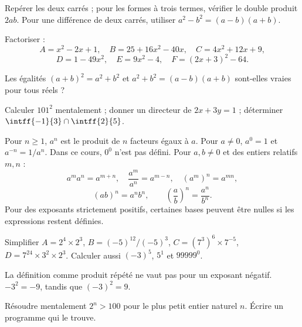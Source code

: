 \begin{method}
Repérer les deux carrés ; pour les formes à trois termes, vérifier le double produit $2ab$. Pour une différence de deux carrés, utiliser $a^2-b^2=(a-b)(a+b)$.
\end{method}
\begin{example}Factoriser :
\[A=x^2-2x+1,\quad B=25+16x^2-40x,\quad C=4x^2+12x+9,\]
\[D=1-49x^2,\quad E=9x^2-4,\quad F=(2x+3)^2-64.\]\end{example}
\begin{example}Les égalités $(a+b)^2=a^2+b^2$ et $a^2+b^2=(a-b)(a+b)$ sont-elles vraies pour tous réels ?\end{example}
\begin{fluency}[5--10 min]Calculer $101^2$ mentalement ; donner un directeur de $2x+3y=1$ ; déterminer $\intff{-1}{3}\cap\intff{2}{5}$.\end{fluency}

\begin{keypoint}
Pour $n\geq1$, $a^n$ est le produit de $n$ facteurs égaux à $a$. Pour $a\ne0$, $a^0=1$ et $a^{-n}=1/a^n$. Dans ce cours, $0^0$ n'est pas défini.
Pour $a,b\ne0$ et des entiers relatifs $m,n$ :
\[a^ma^n=a^{m+n},\quad\frac{a^m}{a^n}=a^{m-n},\quad(a^m)^n=a^{mn},\]
\[(ab)^n=a^nb^n,\qquad\left(\frac ab\right)^n=\frac{a^n}{b^n}.\]
Pour des exposants strictement positifs, certaines bases peuvent être nulles si les expressions restent définies.
\end{keypoint}
\begin{example}Simplifier $A=2^4\times2^3$, $B=(-5)^{12}/(-5)^3$, $C=(7^3)^6\times7^{-5}$, $D=7^{24}\times3^2\times2^3$. Calculer aussi $(-3)^5$, $5^1$ et $99999^0$.\end{example}
\begin{pitfall}La définition comme produit répété ne vaut pas pour un exposant négatif. $-3^2=-9$, tandis que $(-3)^2=9$.\end{pitfall}
\begin{example}Résoudre mentalement $2^n>100$ pour le plus petit entier naturel $n$. Écrire un programme qui le trouve.\end{example}


